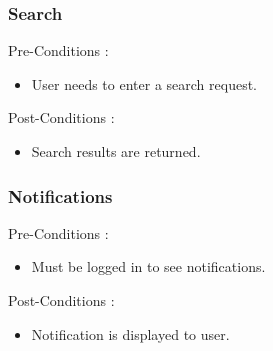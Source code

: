 \documentclass[12pt, oneside]{article}
\begin{document}
			\subsubsection{Search}
				Pre-Conditions : \begin{itemize}
							\item User needs to enter a search request.
						     \end{itemize}
				Post-Conditions : \begin{itemize}
							\item Search results are returned.
						     \end{itemize}	
			\subsubsection{Notifications}
				Pre-Conditions : \begin{itemize}
							\item Must  be logged in to see notifications.
						     \end{itemize}
				Post-Conditions : \begin{itemize}
							\item Notification is displayed to user.
						     \end{itemize}
\end{document}
